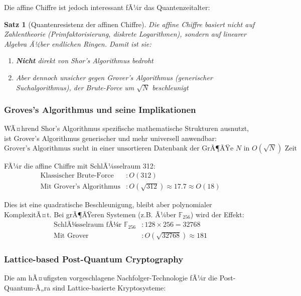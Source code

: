 ﻿\documentclass[12pt,a4paper]{article}
\newtheorem{theorem}{Satz}
\begin{document}
	Die affine Chiffre ist jedoch interessant fÃ¼r das Quantenzeitalter:
	\begin{theorem}[Quantenresistenz der affinen Chiffre]
		Die affine Chiffre basiert nicht auf Zahlentheorie (Primfaktorisierung, diskrete Logarithmen), sondern auf linearer Algebra Ã¼ber endlichen Ringen. Damit ist sie:
		\begin{enumerate}
			\item \textbf{Nicht} direkt von Shor's Algorithmus bedroht
			\item Aber dennoch unsicher gegen Grover's Algorithmus (generischer Suchalgorithmus), der Brute-Force um $\sqrt{N}$ beschleunigt
		\end{enumerate}
	\end{theorem}
	
	\subsubsection{Groves's Algorithmus und seine Implikationen}
	
	WÃ¤hrend Shor's Algorithmus spezifische mathematische Strukturen ausnutzt, ist Grover's Algorithmus generischer und mehr universell anwendbar:
	\begin{equation}
		\text{Grover's Algorithmus sucht in einer unsortieren Datenbank der GrÃ¶ÃŸe } N \text{ in } O(\sqrt{N}) \text{ Zeit}
	\end{equation}
	
	FÃ¼r die affine Chiffre mit SchlÃ¼sselraum 312:
	\begin{align}
		\text{Klassischer Brute-Force} &: O(312) \\
		\text{Mit Grover's Algorithmus} &: O(\sqrt{312}) \approx 17.7 \approx O(18)
	\end{align}
	
	Dies ist eine quadratische Beschleunigung, bleibt aber polynomialer KomplexitÃ¤t. Bei grÃ¶ÃŸeren Systemen (z.B. Ã¼ber $\mathbb{F}_{256}$) wird der Effekt:
	\begin{align}
		\text{SchlÃ¼sselraum fÃ¼r } \mathbb{F}_{256} &: 128 \times 256 = 32768 \\
		\text{Mit Grover} &: O(\sqrt{32768}) \approx 181
	\end{align}
	
	\subsubsection{Lattice-based Post-Quantum Cryptography}
	
	Die am hÃ¤ufigsten vorgeschlagene Nachfolger-Technologie fÃ¼r die Post-Quantum-Ã„ra sind Lattice-basierte Kryptosysteme:
	
\end{document}
